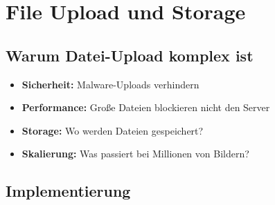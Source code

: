 \documentclass[a4paper,12pt]{article}
\begin{document}
\section{File Upload und Storage}

\subsection{Warum Datei-Upload komplex ist}

\begin{itemize}
    \item \textbf{Sicherheit:} Malware-Uploads verhindern
    \item \textbf{Performance:} Große Dateien blockieren nicht den Server
    \item \textbf{Storage:} Wo werden Dateien gespeichert?
    \item \textbf{Skalierung:} Was passiert bei Millionen von Bildern?
\end{itemize}

\subsection{Implementierung}
\end{document}
